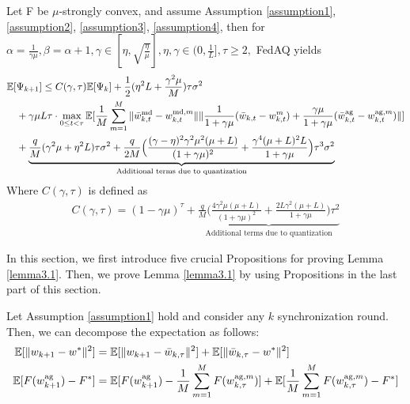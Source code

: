 \documentclass[11pt]{article}
\begin{document}
\begin{lemma} \label{lemma3.1}
 Let F be $\mu$-strongly convex, and assume Assumption \ref{assumption1}, \ref{assumption2}, \ref{assumption3}, \ref{assumption4}, then for $\alpha=\frac{1}{\gamma\mu}, \beta=\alpha+1, \gamma \in [\eta, \sqrt{\frac{\eta}{\mu}}], \eta, \gamma \in (0, \frac{1}{L}], \tau \geq 2, $ FedAQ yields
 \begin{align*}
     \mathbb{E}[&\Psi_{k+1}] \leq C(\gamma, \tau) \mathbb{E}[\Psi_k] + \frac{1}{2}(\eta^2 L+\frac{\gamma^2\mu}{M})\tau\sigma^2 \\
     &+ \gamma\mu L \tau \cdot \max_{0\leq t <\tau} \mathbb{E}[\frac{1}{M} \sum_{m=1}^M \|\Bar{w}_{k, t}^{\textrm{md}} - w_{k, t}^{\textrm{md}, m}\| \|\frac{1}{1+\gamma\mu}(\Bar{w}_{k, t} - w_{k, t}^m) + \frac{\gamma\mu}{1+\gamma\mu}(\Bar{w}_{k, t}^{\textrm{ag}} - w_{k, t}^{\textrm{ag}, m})\|] \\
     &+ \underbrace{\frac{q}{M}(\gamma^2\mu+\eta^2 L)\tau\sigma^2 + \frac{q}{2M}\Big(\frac{(\gamma-\eta)^2\gamma^2\mu^2(\mu+L)}{(1+\gamma\mu)^2} + \frac{\gamma^4(\mu+L)^2 L}{1+\gamma\mu}\Big)\tau^3\sigma^2}_{\textrm{Additional terms due to quantization}}
 \end{align*}
 Where $C(\gamma, \tau)$ is defined as
 \begin{align*}
     C(\gamma, \tau) = (1-\gamma\mu)^\tau + \underbrace{\frac{q}{M}\Big( \frac{4\gamma^2\mu(\mu + L)}{(1+\gamma\mu)^2} + \frac{2L\gamma^2(\mu+L)}{1+\gamma\mu}\Big)\tau^2}_{\textrm{Additional terms due to quantization}}
 \end{align*}
\end{lemma}


In this section, we first introduce five crucial Propositions for proving Lemma \ref{lemma3.1}. Then, we prove Lemma \ref{lemma3.1} by using Propositions in the last part of this section.
\begin{proposition} \label{proposition3.2}
Let Assumption \ref{assumption1} hold and consider any $k$ synchronization round. Then, we can decompose the expectation as follows:
\begin{align*}
    \mathbb{E}[\|w_{k+1} - w^*\|^2] &= \mathbb{E}[\|w_{k+1} - \Bar{w}_{k, \tau}\|^2] + \mathbb{E}[\|\Bar{w}_{k, \tau} - w^*\|^2] \\
    \mathbb{E}[F(w_{k+1}^{\textrm{ag}}) - F^*] &= \mathbb{E}[F(w_{k+1}^{\textrm{ag}}) - \frac{1}{M} \sum_{m=1}^M F(w_{k, \tau}^{\textrm{ag}, m})] + \mathbb{E}[\frac{1}{M} \sum_{m=1}^M F(w_{k, \tau}^{\textrm{ag}, m}) - F^*]
\end{align*}
\end{proposition}
\end{document}
